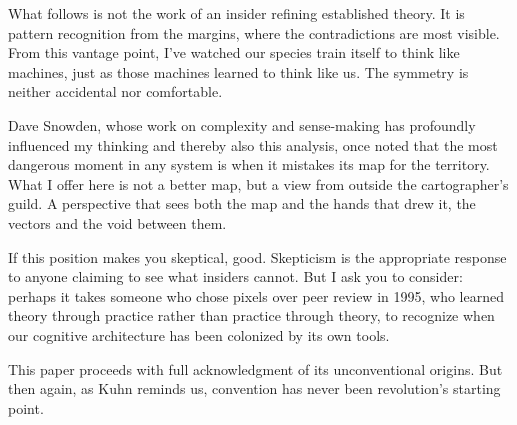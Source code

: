 What follows is not the work of an insider refining established theory. It is pattern recognition from the margins, where the contradictions are most visible. From this vantage point, I've watched our species train itself to think like machines, just as those machines learned to think like us. The symmetry is neither accidental nor comfortable.

Dave Snowden, whose work on complexity and sense-making has profoundly influenced my thinking and thereby also this analysis, once noted that the most dangerous moment in any system is when it mistakes its map for the territory. What I offer here is not a better map, but a view from outside the cartographer's guild. A perspective that sees both the map and the hands that drew it, the vectors and the void between them.

If this position makes you skeptical, good. Skepticism is the appropriate response to anyone claiming to see what insiders cannot. But I ask you to consider: perhaps it takes someone who chose pixels over peer review in 1995, who learned theory through practice rather than practice through theory, to recognize when our cognitive architecture has been colonized by its own tools.

This paper proceeds with full acknowledgment of its unconventional origins. But then again, as Kuhn reminds us, convention has never been revolution's starting point.
